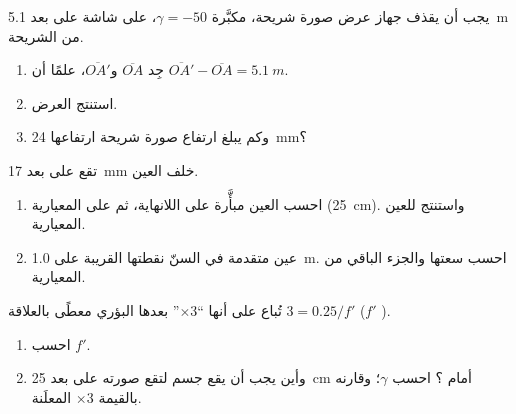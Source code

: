 \begin{exercise}[$\star\star\star$]\label{exo:g11:lenses-and-eye:12}
يجب أن يقذف جهاز عرض صورة شريحة، مكبَّرة $\gamma = -50$،
على شاشة على بعد \qty{5.1}{m} من الشريحة.
\begin{enumerate}
  \item جِد $\overline{OA}$ و$\overline{OA'}$، علمًا أن
        $\overline{OA'} - \overline{OA} = \qty{5.1}{m}$.
  \item استنتج   العرض.
  \item وكم يبلغ ارتفاع صورة شريحة ارتفاعها \qty{24}{mm}؟
\end{enumerate}
\end{exercise}

\begin{exercise}[$\star\star\star$]\label{exo:g11:lenses-and-eye:13}
تقع  على بعد \qty{17}{mm} خلف  العين.
\begin{enumerate}
  \item احسب  العين مبأَّرة على اللانهاية، ثم على
         المعيارية (\qty{25}{cm}). واستنتج 
         للعين المعيارية.
  \item عين متقدمة في السنّ نقطتها القريبة على \qty{1.0}{m}. احسب
        سعتها والجزء الباقي من  المعيارية.
\end{enumerate}
\end{exercise}

\begin{exercise}[$\star\star\star$]\label{exo:g11:lenses-and-eye:14}
 تُباع على أنها ``$\times 3$'' بعدها البؤري معطًى بالعلاقة
$3 = 0.25/f'$ ($f'$ ).
\begin{enumerate}
  \item احسب $f'$.
  \item وأين يجب أن يقع جسم لتقع صورته  على بعد
        \qty{25}{cm} أمام ؟ احسب $\gamma$؛ وقارنه
        بالقيمة $\times 3$ المعلَنة.
\end{enumerate}
\end{exercise}

